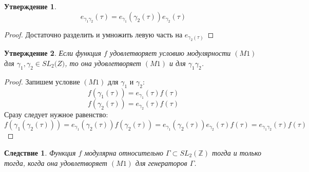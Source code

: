 \documentclass{article}
\newcommand{\ZZ}{\mathbb{Z}}
\theoremstyle{break}
\newtheorem{claim}{Утверждение}[section]
\newtheorem{corollary}{Следствие}[section] %
\begin{document}
\begin{claim}
	$$
	e_{\gamma_1 \gamma_2}(\tau) = e_{\gamma_1}(\gamma_2(\tau)) e_{\gamma_2}(\tau)
	$$
\end{claim}
\begin{proof}
	Достаточно разделить и умножить левую часть на $e_{\gamma_2(\tau)}$
\end{proof}

\begin{claim}
	Если функция $f$ удовлетворяет условию модулярности $(M1)$ для $\gamma_1, \gamma_2 \in SL_2\big(Z)$, то она удовлетворяет $(M1)$ и для $\gamma_1 \gamma_2$.
\end{claim}

\begin{proof}
	Запишем условие $(M1)$ для $\gamma_1$ и $\gamma_2$:
	$$
	f(\gamma_1(\tau)) = e_{\gamma_1}(\tau) f(\tau)
	$$
	$$
	f(\gamma_2(\tau)) = e_{\gamma_2}(\tau) f(\tau)
	$$
	Сразу следует нужное равенство: 
	$$
	f(\gamma_1(\gamma_2(\tau))) = e_{\gamma_1}(\gamma_2(\tau)) f(\gamma_2(\tau))
	= e_{\gamma_1}(\gamma_2(\tau)) e_{\gamma_2}(\tau) f(\tau) 
	= e_{\gamma_1 \gamma_2}(\tau) f(\tau)
	$$
\end{proof}


\begin{corollary}
	Функция $f$ модулярна относительно $\Gamma \subset SL_2(\ZZ)$ тогда и только тогда, когда она удовлетворяет $(M1)$ для генераторов $\Gamma$.
\end{corollary}
\end{document}
